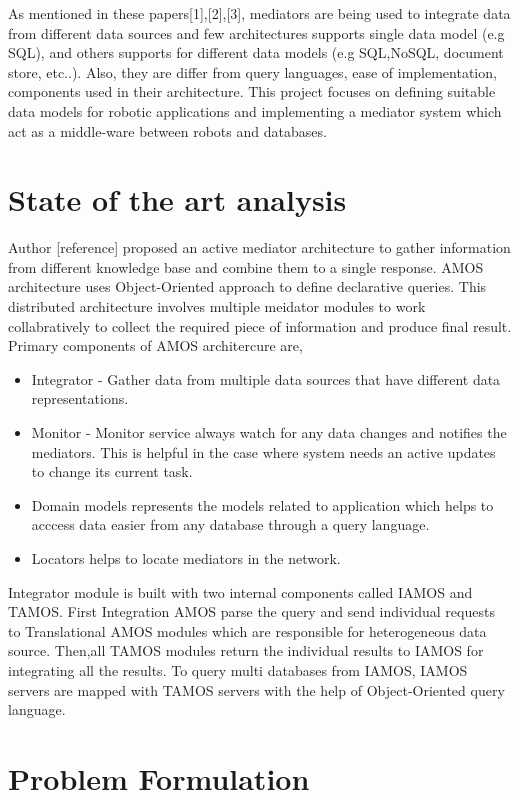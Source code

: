 \documentclass[12pt]{article}
\begin{document}
As mentioned in these papers[1],[2],[3], mediators are being used to integrate data from different data sources and few architectures supports single data model (e.g SQL), and others supports for different data models (e.g SQL,NoSQL, document store, etc..). Also, they are differ from query languages, ease of implementation, components used in their architecture. This project focuses on defining suitable data models for robotic applications and implementing a mediator system which act as a middle-ware between robots and databases. 

\section{State of the art analysis}

Author [reference] proposed an active mediator architecture to gather information from different knowledge base and combine them to a single response. AMOS architecture uses Object-Oriented approach to define declarative queries. This distributed architecture involves multiple meidator modules to work collabratively to collect the required piece of information and produce final result. Primary components of AMOS architercure are,
\begin{itemize}
	\item Integrator - Gather data from multiple data sources that have different data representations.
	\item Monitor - Monitor service always watch for any data changes and notifies the mediators. This is helpful in the case where system needs an active updates to change its current task.
	\item Domain models represents the models related to application which helps to acccess data easier from any database through a query language.
	\item Locators helps to locate mediators in the network.
\end{itemize}


Integrator module is built with two internal components called IAMOS and TAMOS. 
First Integration AMOS parse the query and send individual requests to Translational AMOS modules which are responsible for heterogeneous data source.
Then,all TAMOS modules return the individual results to IAMOS for integrating all the results. To query multi databases from IAMOS, IAMOS servers are mapped with TAMOS servers with the help of Object-Oriented query language.




\section{Problem Formulation}
\end{document}
